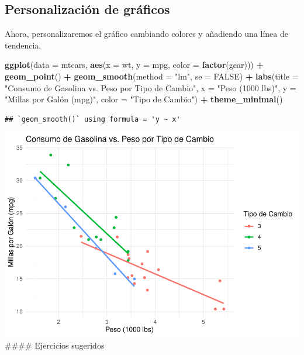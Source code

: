 \documentclass[
]{book}
\newenvironment{Shaded}{\begin{snugshade}}{\end{snugshade}}
\newcommand{\AttributeTok}[1]{\textcolor[rgb]{0.13,0.29,0.53}{#1}}
\newcommand{\ConstantTok}[1]{\textcolor[rgb]{0.56,0.35,0.01}{#1}}
\newcommand{\FunctionTok}[1]{\textcolor[rgb]{0.13,0.29,0.53}{\textbf{#1}}}
\newcommand{\NormalTok}[1]{#1}
\newcommand{\SpecialCharTok}[1]{\textcolor[rgb]{0.81,0.36,0.00}{\textbf{#1}}}
\newcommand{\StringTok}[1]{\textcolor[rgb]{0.31,0.60,0.02}{#1}}
\begin{document}
\subsection{Personalización de gráficos}\label{personalizaciuxf3n-de-gruxe1ficos}

Ahora, personalizaremos el gráfico cambiando colores y añadiendo una línea de tendencia.

\begin{Shaded}
\begin{Highlighting}[]
\FunctionTok{ggplot}\NormalTok{(}\AttributeTok{data =}\NormalTok{ mtcars, }\FunctionTok{aes}\NormalTok{(}\AttributeTok{x =}\NormalTok{ wt, }\AttributeTok{y =}\NormalTok{ mpg, }\AttributeTok{color =} \FunctionTok{factor}\NormalTok{(gear))) }\SpecialCharTok{+} 
  \FunctionTok{geom\_point}\NormalTok{() }\SpecialCharTok{+}
  \FunctionTok{geom\_smooth}\NormalTok{(}\AttributeTok{method =} \StringTok{"lm"}\NormalTok{, }\AttributeTok{se =} \ConstantTok{FALSE}\NormalTok{) }\SpecialCharTok{+}
  \FunctionTok{labs}\NormalTok{(}\AttributeTok{title =} \StringTok{"Consumo de Gasolina vs. Peso por Tipo de Cambio"}\NormalTok{,}
       \AttributeTok{x =} \StringTok{"Peso (1000 lbs)"}\NormalTok{,}
       \AttributeTok{y =} \StringTok{"Millas por Galón (mpg)"}\NormalTok{,}
       \AttributeTok{color =} \StringTok{"Tipo de Cambio"}\NormalTok{) }\SpecialCharTok{+}
  \FunctionTok{theme\_minimal}\NormalTok{()}
\end{Highlighting}
\end{Shaded}

\begin{verbatim}
## `geom_smooth()` using formula = 'y ~ x'
\end{verbatim}

\includegraphics{bookdown-demo_files/figure-latex/unnamed-chunk-177-1.pdf}
\#\#\#\# Ejercicios sugeridos
\end{document}
